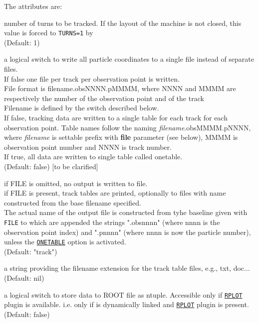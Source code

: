 The attributes are:
\begin{madlist}
    number of turns to be tracked. If the layout of the
   machine is not closed, this value is forced to {\tt TURNS=1} by \ptc 
   \\ (Default: 1)
     
   \label{opt:onetable2} a logical switch to write all
   particle coordinates to a single file instead of separate files. \\

   If false one file per track per observation point is written.\\ 
   File format is filename.obsNNNN.pMMMM, where NNNN and MMMM are
   respectively the number of the observation point and of the track\\
   Filename is defined by the switch described below. \\
   If false, tracking data are written to a single table for each
   track for each observation point. Table names follow the naming
   \textit{filename}.obsMMMM.pNNNN, where \textit{filename} is
   settable prefix with \textbf{file} parameter (see below), MMMM is
   observation point number and NNNN is track number. \\  
   If true, all data are written to single table called onetable. 
   \\ (Default: false) [to be clarified]

    if FILE is omitted, no output is written to file.\\
     if FILE is present, track tables are printed, optionally to 
     files with name constructed from the base filename specified. \\
     The actual name of the output file is constructed from
     tyhe baseline given with {\tt FILE} to which are appended the
     strings ".obsnnnn" (where nnnn is the observation point index) and
     ".pnnnn" (where nnnn is now the particle number), unless the
     \hyperref[opt:onetable2]{\tt ONETABLE} option is activated.  \\
     (Default: "track") 

    a string providing the filename extension for the
   track table files, e.g., txt, doc...  \\ (Default: nil)

    a logical switch to store data to ROOT file as
   ntuple. Accessible only if \hyperref[sec:rplot]{\tt RPLOT} plugin is
   available. i.e. only if \madx is dynamically linked and
   \hyperref[sec:rplot]{\tt RPLOT} plugin is present. \\ 
   (Default: false)


\end{madlist}

